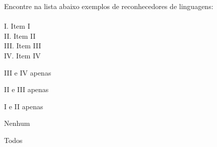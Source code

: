\question[10]
Encontre na lista abaixo exemplos de reconhecedores de linguagens:\\
\\
I. Item I\\
II. Item II\\
III. Item III\\
IV. Item IV
\\
\begin{choices}
\item III e IV apenas
\item II e III apenas
\item I e II apenas
\item Nenhum %
\item Todos
\end{choices}
\answerline

